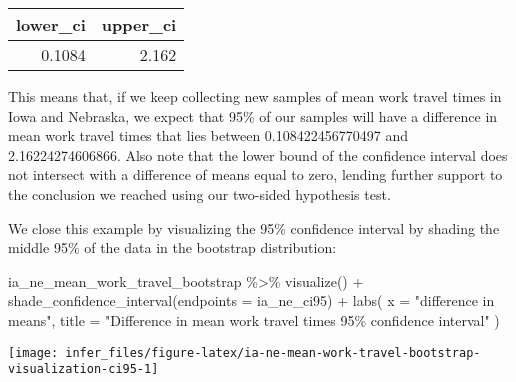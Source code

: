 \documentclass[
]{book}
\newenvironment{Shaded}{\begin{snugshade}}{\end{snugshade}}
\newcommand{\AttributeTok}[1]{\textcolor[rgb]{0.77,0.63,0.00}{#1}}
\newcommand{\FunctionTok}[1]{\textcolor[rgb]{0.00,0.00,0.00}{#1}}
\newcommand{\NormalTok}[1]{#1}
\newcommand{\SpecialCharTok}[1]{\textcolor[rgb]{0.00,0.00,0.00}{#1}}
\newcommand{\StringTok}[1]{\textcolor[rgb]{0.31,0.60,0.02}{#1}}
\begin{document}
\begin{table}
\centering
\begin{tabular}{r|r}
\hline
lower\_ci & upper\_ci\\
\hline
0.1084 & 2.162\\
\hline
\end{tabular}
\end{table}

This means that, if we keep collecting new samples of mean work travel times in Iowa and Nebraska, we expect that 95\% of our samples will have a difference in mean work travel times that lies between 0.108422456770497 and 2.16224274606866.
Also note that the lower bound of the confidence interval does not intersect with a difference of means equal to zero, lending further support to the conclusion we reached using our two-sided hypothesis test.

We close this example by visualizing the 95\% confidence interval by shading the middle 95\% of the data in the bootstrap distribution:

\begin{Shaded}
\begin{Highlighting}[]
\NormalTok{ia\_ne\_mean\_work\_travel\_bootstrap }\SpecialCharTok{\%\textgreater{}\%}
  \FunctionTok{visualize}\NormalTok{() }\SpecialCharTok{+}
  \FunctionTok{shade\_confidence\_interval}\NormalTok{(}\AttributeTok{endpoints =}\NormalTok{ ia\_ne\_ci95) }\SpecialCharTok{+}
  \FunctionTok{labs}\NormalTok{(}
    \AttributeTok{x =} \StringTok{"difference in means"}\NormalTok{,}
    \AttributeTok{title =} \StringTok{"Difference in mean work travel times 95\% confidence interval"}
\NormalTok{  )}
\end{Highlighting}
\end{Shaded}

\begin{center}\texttt{[image: infer\_files/figure-latex/ia-ne-mean-work-travel-bootstrap-visualization-ci95-1]} \end{center}

  
\end{document}
